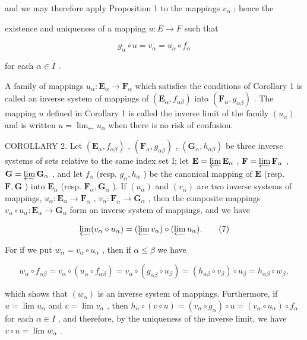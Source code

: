 and we may therefore apply Proposition 1 to the mappings \(v_{\alpha}\) ; hence the

existence and uniqueness of a mapping \(u: E \rightarrow F\) such that

\[
g _ {\alpha} \circ u = v _ {\alpha} = u _ {\alpha} \circ f _ {\alpha}
\]

for each \(\alpha \in I\) .

A family of mappings \(u_{\alpha}: \mathbf{E}_{\alpha} \to \mathbf{F}_{\alpha}\) which satisfies the conditions of Corollary 1 is called an inverse system of mappings of \((\mathbf{E}_{\alpha}, f_{\alpha\beta})\) into \((\mathbf{F}_{\alpha}, g_{\alpha\beta})\) . The mapping \(u\) defined in Corollary 1 is called the inverse limit of the family \((u_{\alpha})\) and is written \(u = \lim_{\leftarrow} u_{\alpha}\) when there is no risk of confusion.

COROLLARY 2. Let \((\mathbf{E}_{\alpha}, f_{\alpha \beta})\) , \((\mathbf{F}_{\alpha}, g_{\alpha \beta})\) , \((\mathbf{G}_{\alpha}, h_{\alpha \beta})\) be three inverse systems of sets relative to the same index set I; let \(\mathbf{E} = \varprojlim \mathbf{E}_{\alpha}\) , \(\mathbf{F} = \varprojlim \mathbf{F}_{\alpha}\) , \(\mathbf{G} = \varprojlim \mathbf{G}_{\alpha}\) , and let \(f_{\alpha}\) (resp. \(g_{\alpha}, h_{\alpha}\) ) be the canonical mapping of \(\mathbf{E}\) (resp. \(\mathbf{F}, \mathbf{G}\) ) into \(\mathbf{E}_{\alpha}\) (resp. \(\mathbf{F}_{\alpha}, \mathbf{G}_{\alpha}\) ). If \((u_{\alpha})\) and \((v_{\alpha})\) are two inverse systems of mappings, \(u_{\alpha}: \mathbf{E}_{\alpha} \to \mathbf{F}_{\alpha}\) , \(v_{\alpha}: \mathbf{F}_{\alpha} \to \mathbf{G}_{\alpha}\) , then the composite mappings \(v_{\alpha} \circ u_{\alpha}: \mathbf{E}_{\alpha} \to \mathbf{G}_{\alpha}\) form an inverse system of mappings, and we have

\[
\varprojlim (v _ {\alpha} \circ u _ {\alpha}) = (\varprojlim v _ {\alpha}) \circ (\varprojlim u _ {\alpha}).\tag{7}
\]

For if we put \(w_{\alpha} = v_{\alpha} \circ u_{\alpha}\) , then if \(\alpha \leqslant \beta\) we have

\[
w _ {\alpha} \circ f _ {\alpha \beta} = v _ {\alpha} \circ (u _ {\alpha} \circ f _ {\alpha \beta}) = v _ {\alpha} \circ (g _ {\alpha \beta} \circ u _ {\beta}) = (h _ {\alpha \beta} \circ v _ {\beta}) \circ u _ {\beta} = h _ {\alpha \beta} \circ w _ {\beta},
\]

which shows that \((w_{\alpha})\) is an inverse system of mappings. Furthermore, if \(u = \lim u_{\alpha}\) and \(v = \lim v_{\alpha}\) , then \(h_{\alpha} \circ (v \circ u) = (v_{\alpha} \circ g_{\alpha}) \circ u = (v_{\alpha} \circ u_{\alpha}) \circ f_{\alpha}\) for each \(\alpha \in I\) , and therefore, by the uniqueness of the inverse limit, we have \(v \circ u = \lim w_{\alpha}\) .

